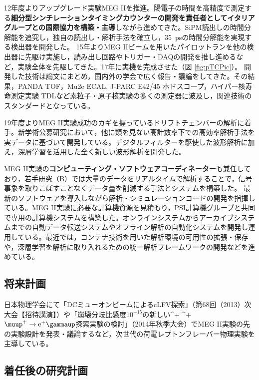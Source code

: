 \documentclass[11pt,a4paper,uplatex,dvipdfmx]{ujarticle} 		%
\newcommand{\研究課題名}{象の卵}
\newcommand{\研究機関名}{東京大学}
\newcommand{\研究代表者氏名}{内山雄祐}
\newcommand{\研究期間の最終元号年度}{6}  %
\renewcommand{\emph}[1]{{\sffamily\bfseries{#1}}}
\newcommand*{\megc}{\ifmmode\muup^+ \to \mathrm{e}^+ \gammaup\else$\muup^+ \to \mathrm{e}^+ \gammaup$\fi}
\begin{document}
12年度よりアップグレード実験MEG IIを推進\cite{upgrade_proposal}。陽電子の時間を高精度で測定する\emph{細分型シンチレーションタイミングカウンターの開発を責任者としてイタリアグループとの国際協力を構築・主導}しながら進めてきた。SiPM読出しの時間分解能を追究し，独自の読出し・解析手法を確立し\cite{tc-single}，35~psの時間分解能を実現する検出器を開発した\cite{laser, vci2016}。
15年よりMEG IIビームを用いたパイロットランを他の検出器に先駆け実施し，読み出し回路やトリガー・DAQの開発を推し進めるなど，実験全体を先駆してきた。17年に実機を完成させた\cite{vci2019}（図 \ref{fig:pTCPic}）。
開発した技術は論文にまとめ\cite{radiation, laser, btf2014, tc-single}，国内外の学会で広く報告・議論をしてきた。その結果，PANDA TOF，Mu2e ECAL, J-PARC E42/45 ホドスコープ，ハイパー核寿命測定実験 TDLなど素粒子・原子核実験の多くの測定器に波及し，関連技術のスタンダードとなっている。

19年度よりMEG II実験成功のカギを握っているドリフトチェンバーの解析に着手。新学術公募研究において，他に類を見ない高計数率下での高効率解析手法を実データに基づいて開発している。デジタルフィルターを駆使した波形解析に加え，深層学習を活用した全く新しい波形解析を開発した。

MEG II実験の\emph{コンピューティング・ソフトウェアコーディネーター}も兼任しており，若手研究（B）では大量のデータをリアルタイムで解析することで，信号事象を取りこぼすことなくデータ量を削減する手法とシステムを構築した。
最新のソフトウェアを導入しながら解析・シミュレーションコードの開発を指揮している。MEG II実験に必要な計算機資源を見積もり，PSI計算機グループと共同で専用の計算機システムを構築した。オンラインシステムからアーカイブシステムまでの自動データ転送システムやオフライン解析の自動化システムを開発し運用している。最近では，コンテナ技術を用いた解析環境の可用性の拡張・保存や，深層学習を解析に取り入れるための統一解析フレームワークの開発などを進めている。

\subsection{将来計画}
日本物理学会にて「DCミューオンビームによるcLFV探索」（第68回（2013）次大会【招待講演】）や「崩壊分岐比感度$10^{-15}$の新しい\megc 探索実験の検討」（2014年秋季大会）でMEG II実験の先の実験設計を発表・議論するなど，次世代の荷電レプトンフレーバー物理実験を主導している\cite{himb}。

\subsection{着任後の研究計画}
\end{document}
